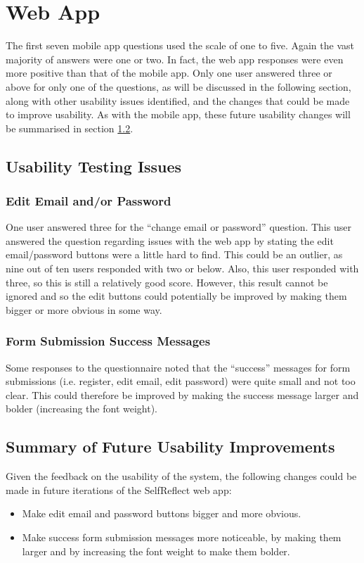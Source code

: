 \documentclass[11pt,openright,a4paper]{report}
\begin{document}
\section{Web App}
The first seven mobile app questions used the scale of one to five. Again the vast majority of answers were one or two. In fact, the web app responses were even more positive than that of the mobile app. Only one user answered three or above for only one of the questions, as will be discussed in the following section, along with other usability issues identified, and the changes that could be made to improve usability. As with the mobile app, these future usability changes will be summarised in section \ref{subsec:webusabilityimp}.

\subsection{Usability Testing Issues}
\subsubsection{Edit Email and/or Password}
One user answered three for the \enquote{change email or password} question. This user answered the question regarding issues with the web app by stating the edit email/password buttons were a little hard to find. This could be an outlier, as nine out of ten users responded with two or below. Also, this user responded with three, so this is still a relatively good score. However, this result cannot be ignored and so the edit buttons could potentially be improved by making them bigger or more obvious in some way.

\subsubsection{Form Submission Success Messages}
Some responses to the questionnaire noted that the \enquote{success} messages for form submissions (i.e. register, edit email, edit password) were quite small and not too clear. This could therefore be improved by making the success message larger and bolder (increasing the font weight).

\subsection{Summary of Future Usability Improvements} \label{subsec:webusabilityimp}
Given the feedback on the usability of the system, the following changes could be made in future iterations of the SelfReflect web app:
\begin{itemize}
\item Make edit email and password buttons bigger and more obvious.
\item Make success form submission messages more noticeable, by making them larger and by increasing the font weight to make them bolder.
\end{itemize}
\end{document}
